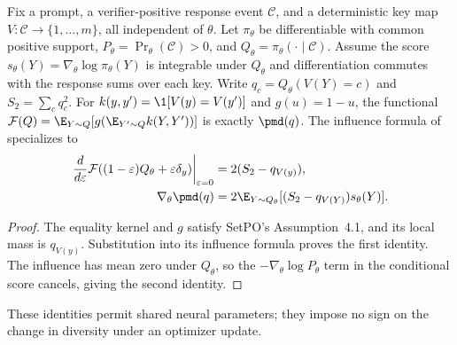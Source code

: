 \begin{corollary}
\label{cor:pcmd-setpo-neural}
Fix a prompt, a verifier-positive response event $\mathcal C$, and a
deterministic key map $V:\mathcal C\to\{1,\ldots,m\}$, all independent
of $\theta$. Let $\pi_\theta$ be differentiable with common positive support,
$P_\theta=\Pr_\theta(\mathcal C)>0$, and
$Q_\theta=\pi_\theta(\cdot\mid\mathcal C)$. Assume the score
$s_\theta(Y)=\nabla_\theta\log\pi_\theta(Y)$ is integrable under $Q_\theta$
and differentiation commutes with the response sums over each key.
Write $q_c=Q_\theta(V(Y)=c)$ and $S_2=\sum_cq_c^2$.
For $k(y,y')=\1[V(y)=V(y')]$ and $g(u)=1-u$, the functional
$\mathcal F(Q)=\E_{Y\sim Q}[g(\E_{Y'\sim Q}k(Y,Y'))]$ is exactly
$\pmd(q)$. The influence formula of
\citet[Theorem~4.2, v1]{li2026setpo} specializes to
\begin{align}
 \left.\frac{d}{d\varepsilon}
  \mathcal F((1-\varepsilon)Q_\theta+\varepsilon\delta_y)
  \right|_{\varepsilon=0}
 &=2(S_2-q_{V(y)}),\label{eq:pcmd-setpo-influence}\\
 \nabla_\theta\pmd(q)
 &=2\E_{Y\sim Q_\theta}
       [(S_2-q_{V(Y)})s_\theta(Y)].
 \label{eq:pcmd-neural-gradient}
\end{align}
\end{corollary}
\begin{proof}
The equality kernel and $g$ satisfy SetPO's Assumption~4.1, and its local
mass is $q_{V(y)}$. Substitution into its influence formula proves the first
identity. The influence has mean zero under $Q_\theta$, so the
$-\nabla_\theta\log P_\theta$ term in the conditional score cancels,
giving the second identity.
\end{proof}
These identities permit shared neural parameters; they impose no sign on
the change in diversity under an optimizer update.
